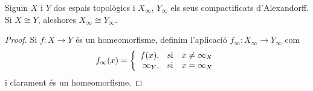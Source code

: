 \documentclass[../main.tex]{subfiles}
\begin{document}
\begin{prop}
\label{prop:compactificatalexandroffhomeomorfisme} Siguin $X$ i $Y$ dos espais topològics i $X_\infty$, $Y_\infty$ els seus compactificats d'Alexandorff. Si $X\cong Y$, aleshores $X_\infty\cong Y_\infty$. 
\end{prop}
\begin{proof}
Si $f:X\rightarrow Y$ és un homeomorfisme, definim l'aplicació $f_\infty:X_\infty\rightarrow Y_\infty$ com
\begin{equation}
    \notag
    f_\infty(x) = \left\{
    \begin{array}{rcl}
        f(x), & \text{si} & x\not=\infty_X \\
        \infty_Y, & \text{si} & x=\infty_X
    \end{array}
    \right.
\end{equation}
i clarament és un homeomorfisme.
\end{proof}
\end{document}

